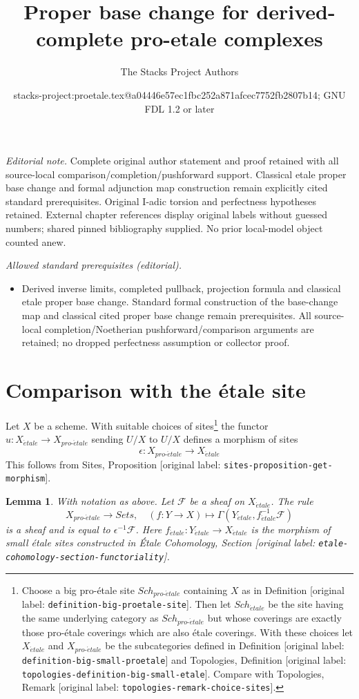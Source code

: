 \documentclass[10pt,a4paper]{article}
\title{Proper base change for derived-complete pro-etale complexes}
\author{The Stacks Project Authors}
\date{stacks-project:proetale.tex@a04446e57ec1fbc252a871afcec7752fb2807b14; GNU FDL 1.2 or later}
\theoremstyle{plain}
\newtheorem{lemma}[subsection]{Lemma}
\theoremstyle{definition}
\theoremstyle{remark}
\numberwithin{equation}{subsection}
\def\Sch{\mathit{Sch}}
\def\proetale{{pro\text{-}\acute{e}tale}}
\def\etale{{\acute{e}tale}}
\begin{document}
\maketitle
\noindent\textit{Editorial note.} Complete original author statement and proof retained with all source-local comparison/completion/pushforward support. Classical etale proper base change and formal adjunction map construction remain explicitly cited standard prerequisites. Original I-adic torsion and perfectness hypotheses retained. External chapter references display original labels without guessed numbers; shared pinned bibliography supplied. No prior local-model object counted anew.\par\medskip
\noindent\textit{Allowed standard prerequisites (editorial).}\begin{itemize}
\item Derived inverse limits, completed pullback, projection formula and classical etale proper base change. Standard formal construction of the base-change map and classical cited proper base change remain prerequisites. All source-local completion/Noetherian pushforward/comparison arguments are retained; no dropped perfectness assumption or collector proof.
\end{itemize}\medskip
\section{Comparison with the \'etale site}
\label{section-comparison}

\noindent
Let $X$ be a scheme. With suitable choices of sites\footnote{Choose
a big pro-\'etale site $\Sch_\proetale$ containing $X$ as in
Definition [original label: \nolinkurl{definition-big-proetale-site}]. Then let $\Sch_\etale$
be the site having the same underlying category as $\Sch_\proetale$ but
whose coverings are exactly those pro-\'etale coverings which are also
\'etale coverings. With these choices let $X_\etale$ and $X_\proetale$
be the subcategories defined in
Definition [original label: \nolinkurl{definition-big-small-proetale}] and
Topologies, Definition [original label: \nolinkurl{topologies-definition-big-small-etale}].
Compare with
Topologies, Remark [original label: \nolinkurl{topologies-remark-choice-sites}].}
the functor $u : X_\etale \to X_\proetale$ sending
$U/X$ to $U/X$ defines a morphism of sites
$$
\epsilon : X_\proetale \longrightarrow X_\etale
$$
This follows from Sites, Proposition [original label: \nolinkurl{sites-proposition-get-morphism}].

\begin{lemma}
\label{lemma-describe-pullback-from-etale}
With notation as above. Let $\mathcal{F}$ be a sheaf on $X_\etale$.
The rule
$$
X_\proetale \longrightarrow \textit{Sets},\quad
(f : Y \to X) \longmapsto \Gamma(Y_\etale, f_\etale^{-1}\mathcal{F})
$$
is a sheaf and is equal to $\epsilon^{-1}\mathcal{F}$.
Here $f_\etale : Y_\etale \to X_\etale$ is the morphism of
small \'etale sites constructed in
\'Etale Cohomology, Section [original label: \nolinkurl{etale-cohomology-section-functoriality}].
\end{lemma}
\end{document}
